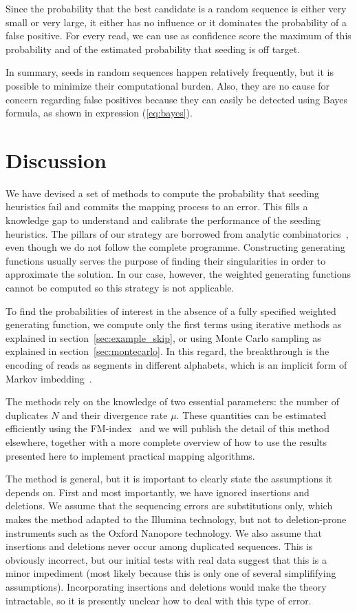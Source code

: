 \documentclass{article}
\begin{document}
Since the probability that the best candidate is a random sequence is
either very small or very large, it either has no influence or it
dominates the probability of a false positive. For every read, we can use
as confidence score the maximum of this probability and of the estimated
probability that seeding is off target.

In summary, seeds in random sequences happen relatively frequently, but it
is possible to minimize their computational burden. Also, they are no
cause for concern regarding false positives because they can easily be
detected using Bayes formula, as shown in expression (\ref{eq:bayes}).



\section{Discussion}

We have devised a set of methods to compute the probability that seeding
heuristics fail and commits the mapping process to an error. This
fills a knowledge gap to understand and calibrate the performance of the
seeding heuristics. The pillars of our strategy are borrowed from analytic
combinatorics~\cite{flajolet2009analytic, sedgewick2013introduction}, even
though we do not follow the complete programme. Constructing generating
functions usually serves the purpose of finding their singularities in
order to approximate the solution. In our case, however, the weighted
generating functions cannot be computed so this strategy is not
applicable.

To find the probabilities of interest in the absence of a fully specified
weighted generating function, we compute only the first terms using
iterative methods as explained in section~\ref{sec:example_skip}, or using
Monte Carlo sampling as explained in section~\ref{sec:montecarlo}. In this
regard, the breakthrough is the encoding of reads as segments in different
alphabets, which is an implicit form of Markov
imbedding~\cite{fu1994distribution}.

The methods rely on the knowledge of two essential parameters: the number
of duplicates $N$ and their divergence rate $\mu$. These quantities can be
estimated efficiently using the FM-index~\cite{ferragina2005indexing} and
we will publish the detail of this method elsewhere, together with a more
complete overview of how to use the results presented here to implement
practical mapping algorithms.

The method is general, but it is important to clearly state the
assumptions it depends on. First and most importantly, we have ignored
insertions and deletions. We assume that the sequencing errors are
substitutions only, which makes the method adapted to the Illumina
technology, but not to deletion-prone instruments such as the Oxford
Nanopore technology. We also assume that insertions and deletions never
occur among duplicated sequences. This is obviously incorrect, but our
initial tests with real data suggest that this is a minor impediment (most
likely because this is only one of several simplififying assumptions).
Incorporating insertions and deletions would make the theory intractable,
so it is presently unclear how to deal with this type of error.
\end{document}
